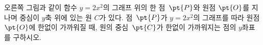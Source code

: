 \noindent\begin{minipage}[t]{0.58\linewidth}\vspace{0pt}\raggedright 오른쪽 그림과 같이 함수 $y=2x^2$의 그래프 위의 한 점~$\pt{P}$와 원점 $\pt{O}$를 지나며 중심이 $y$축 위에 있는 원 $C$가 있다. 점~$\pt{P}$가 $y=2x^2$의 그래프를 따라 원점 $\pt{O}$에 한없이 가까워질 때, 원의 중심~$\pt{C}$가 한없이 가까워지는 점의 $y$좌표를 구하시오.\end{minipage}\hfill\begin{minipage}[t]{0.4\linewidth}\vspace{0pt}\centering \resizebox{\ifdim\width>\linewidth\linewidth\else\width\fi}{!}{}\end{minipage}\par
